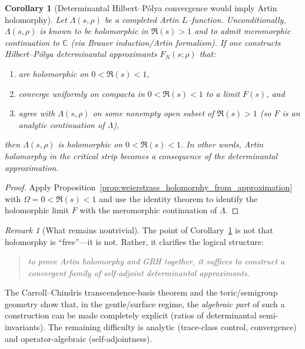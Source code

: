 \documentclass[11pt,oneside]{amsbook}
\numberwithin{equation}{section}
\theoremstyle{plain}
\newtheorem{corollary}[theorem]{Corollary}
\theoremstyle{definition}
\theoremstyle{remark}
\newtheorem{remark}[theorem]{Remark}
\newcommand{\C}{\mathbb{C}}
\begin{document}
\begin{corollary}[Determinantal Hilbert--P\'olya convergence would imply Artin holomorphy]
\label{cor:hp_implies_artin_holomorphy}
Let $\Lambda(s,\rho)$ be a completed Artin $L$--function.
Unconditionally, $\Lambda(s,\rho)$ is known to be holomorphic in $\Re(s)>1$ and to admit meromorphic continuation to $\C$ (via Brauer induction/Artin formalism).
If one constructs Hilbert--P\'olya determinantal approximants $F_N(s;\rho)$ that:
\begin{enumerate}[label=(\roman*)]
\item are holomorphic on $0<\Re(s)<1$,
\item converge uniformly on compacta in $0<\Re(s)<1$ to a limit $F(s)$, and
\item agree with $\Lambda(s,\rho)$ on some nonempty open subset of $\Re(s)>1$ (so $F$ is an analytic continuation of $\Lambda$),
\end{enumerate}
then $\Lambda(s,\rho)$ is holomorphic on $0<\Re(s)<1$.
In other words, \emph{Artin holomorphy in the critical strip becomes a consequence of the determinantal approximation}.
\end{corollary}

\begin{proof}
Apply Proposition~\ref{prop:weierstrass_holomorphy_from_approximation} with $\Omega=0<\Re(s)<1$ and use the identity theorem to identify the holomorphic limit $F$ with the meromorphic continuation of $\Lambda$.
\end{proof}

\begin{remark}[What remains nontrivial]
The point of Corollary~\ref{cor:hp_implies_artin_holomorphy} is not that holomorphy is ``free''---it is not.
Rather, it clarifies the logical structure:
\begin{quote}
\emph{to prove Artin holomorphy and GRH together, it suffices to construct a convergent family of self-adjoint determinantal approximants.}
\end{quote}
The Carroll--Chindris transcendence-basis theorem and the toric/semigroup geometry show that, in the gentle/surface regime, the \emph{algebraic part} of such a construction can be made completely explicit (ratios of determinantal semi-invariants).
The remaining difficulty is analytic (trace-class control, convergence) and operator-algebraic (self-adjointness).
\end{remark}
\end{document}

